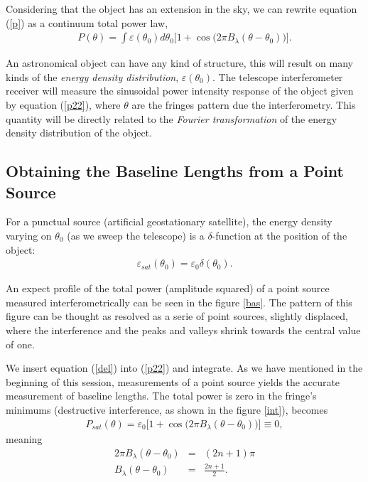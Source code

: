 Considering that the object has an extension in the sky,  we can rewrite equation (\ref{p}) as a continuum total power law,
\begin{eqnarray}
P(\theta) = \int \varepsilon (\theta_0) d\theta_0 \Bigg [1+ \cos \Big (2\pi B_{\lambda} (\theta - \theta_0)\Big)\Bigg ].
\label{p22}
\end{eqnarray}

An astronomical object can have any kind of structure, this will result on many kinds of the {\it energy density distribution},  $\varepsilon(\theta_0)$. The telescope interferometer receiver will measure the  sinusoidal power intensity response of the object given by equation (\ref{p22}), where $\theta$ are the fringes pattern due the interferometry. This quantity will be directly related to the {\it Fourier transformation} of the energy density distribution of the object.

\bigskip



\subsection{Obtaining the Baseline Lengths from a Point Source }



For a punctual source (artificial geostationary satellite), the energy density varying  on $\theta_0$ (as we sweep the telescope)  is a $\delta$-function at the position of the object:
\begin{eqnarray}
 \varepsilon_{sat} (\theta_0) = \varepsilon_0 \delta (\theta_0). 
\label{del}
\end{eqnarray}

An expect profile of the total power (amplitude squared) of a point source measured interferometrically can be seen in the figure \ref{bas}. The pattern of this figure can be thought as resolved  as a serie of point sources, slightly displaced, where the interference and the peaks and valleys shrink towards the central value of one. 


We insert equation (\ref{del}) into (\ref{p22}) and integrate. As we have mentioned in the beginning of this session,  measurements of a point source yields the accurate measurement of  baseline lengths. The total power is zero in the fringe's minimums (destructive interference, as shown in the figure \ref{int}), becomes
\begin{eqnarray}
P_{sat}(\theta) = \varepsilon_0  \Bigg [1+ \cos \Big (2\pi B_{\lambda} (\theta - \theta_0) \Big ) \Bigg] \equiv 0,
\label{p223}
\end{eqnarray}
meaning
\begin{eqnarray}
2\pi B_{\lambda} (\theta - \theta_0) & =& (2n+1) \pi  \nonumber \\
B_{\lambda} (\theta - \theta_0) & =& \frac{2n+1}{2}. \nonumber
\end{eqnarray}

